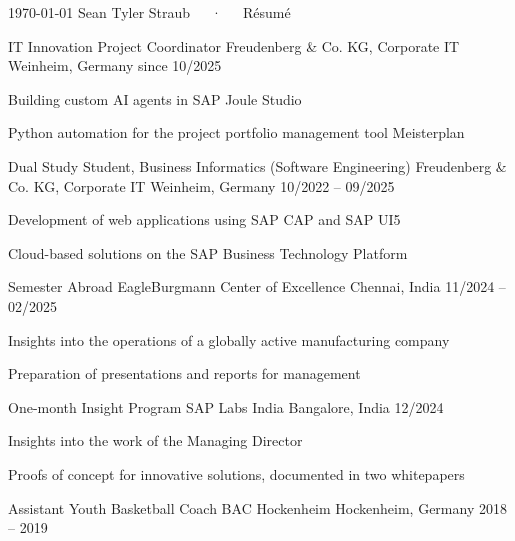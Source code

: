 \documentclass[11pt, a4paper]{awesome-cv}
\begin{document}
\makecvheader[C]

\makecvfooter
  {\today}
  {Sean Tyler Straub~~~·~~~Résumé}
  {\thepage}


\begin{cventries}

\cventry
  {IT Innovation Project Coordinator}
  {Freudenberg \& Co. KG, Corporate IT}
  {Weinheim, Germany}
  {since 10/2025}
  {
    \begin{cvitems}
      \item {Building custom AI agents in SAP Joule Studio}
      \item {Python automation for the project portfolio management tool Meisterplan}
    \end{cvitems}
  }

\cventry
  {Dual Study Student, Business Informatics (Software Engineering)}
  {Freudenberg \& Co. KG, Corporate IT}
  {Weinheim, Germany}
  {10/2022 -- 09/2025}
  {
    \begin{cvitems}
      \item {Development of web applications using SAP CAP and SAP UI5}
      \item {Cloud-based solutions on the SAP Business Technology Platform}
    \end{cvitems}
  }

\cventry
  {Semester Abroad}
  {EagleBurgmann Center of Excellence}
  {Chennai, India}
  {11/2024 -- 02/2025}
  {
    \begin{cvitems}
      \item {Insights into the operations of a globally active manufacturing company}
      \item {Preparation of presentations and reports for management}
    \end{cvitems}
  }

\cventry
  {One-month Insight Program}
  {SAP Labs India}
  {Bangalore, India}
  {12/2024}
  {
    \begin{cvitems}
      \item {Insights into the work of the Managing Director}
      \item {Proofs of concept for innovative solutions, documented in two whitepapers}
    \end{cvitems}
  }

\cventry
  {Assistant Youth Basketball Coach}
  {BAC Hockenheim}
  {Hockenheim, Germany}
  {2018 -- 2019}
  {}

\end{cventries}
\end{document}
